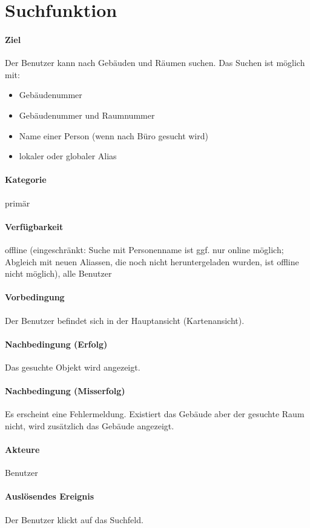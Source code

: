 \section{Suchfunktion}
\paragraph{Ziel}
Der Benutzer kann nach Gebäuden und Räumen suchen. 
Das Suchen ist möglich mit:
\begin{itemize}
    \item Gebäudenummer
    \item Gebäudenummer und Raumnummer
    \item Name einer Person (wenn nach Büro gesucht wird)
    \item lokaler oder globaler Alias
\end{itemize}

\paragraph{Kategorie}
primär
\paragraph{Verfügbarkeit}
offline (eingeschränkt: Suche mit Personenname ist ggf. nur online möglich; Abgleich mit neuen Aliassen, die noch nicht heruntergeladen wurden, ist offline nicht möglich), alle Benutzer
\paragraph{Vorbedingung}
Der Benutzer befindet sich in der Hauptansicht (Kartenansicht).
\paragraph{Nachbedingung (Erfolg)}
Das gesuchte Objekt wird angezeigt.
\paragraph{Nachbedingung (Misserfolg)}
Es erscheint eine Fehlermeldung. Existiert das Gebäude aber der gesuchte Raum nicht, wird zusätzlich das Gebäude angezeigt.
\paragraph{Akteure}
Benutzer
\paragraph{Auslösendes Ereignis}
Der Benutzer klickt auf das Suchfeld.
